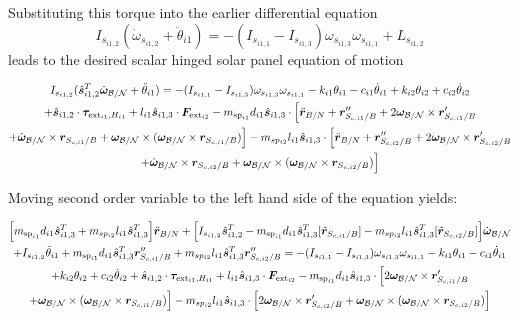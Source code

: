 \documentclass[paper]{aiaaNew}
\begin{document}
	Substituting this torque into the earlier differential equation
\begin{equation}
I_{s_{i1,2}} ( \dot\omega_{s_{i1,2}} + \ddot\theta_{i1}) = - (I_{s_{i1,1}} - I_{s_{i1,3}}) \omega_{s_{i1,3}} \omega_{s_{i1,1}} + L_{s_{i1,2}}
\end{equation}
leads to the desired scalar hinged solar panel equation of motion

\begin{multline}
I_{s_{i1,2}} ( \hat{\bm s}_{i1,2}^T \dot{\bm\omega}_{\cal B/N} + \ddot\theta_{i1}) = - (I_{s_{i1,1}} - I_{s_{i1,3}}) \omega_{s_{i1,3}} \omega_{s_{i1,1}} - k_{i1} \theta_{i1} - c_{i1}\dot{\theta}_{i1} +  k_{i2} \theta_{i2} + c_{i2} \dot\theta_{i2} \\
+ \hat{\bm s}_{i1,2} \cdot \bm \tau_{\text{ext}_{i1},H_{i1}} + l_{i1} \hat{\bm s}_{i1,3} \cdot \bm F_{\text{ext}_{i2}}
- m_{\text{sp}_{i1}} d_{i1} \hat{\bm s}_{i1,3} \cdot \Big[\ddot{\bm{r}}_{B/N} + \bm{r}''_{S_{c,i1}/B} + 2 \bm\omega_{\cal B/N} \times \bm{r}'_{S_{c,i1}/B} \\
+  \dot{\bm\omega}_{\cal B/N} \times \bm{r}_{S_{c,i1}/B}
+ \bm\omega_{\cal B/N} \times (\bm\omega_{\cal B/N} \times \bm{r}_{S_{c,i1}/B})\Big]
- m_{sp_{i2}} l_{i1} \hat{\bm s}_{i1,3} \cdot \Big[\ddot{\bm{r}}_{B/N} + \bm{r}''_{S_{c,i2}/B} + 2 \bm\omega_{\cal B/N} \times \bm{r}'_{S_{c,i2}/B} \\
+  \dot{\bm\omega}_{\cal B/N} \times \bm{r}_{S_{c,i2}/B} + \bm\omega_{\cal B/N} \times (\bm\omega_{\cal B/N} \times \bm{r}_{S_{c,i2}/B})\Big]
\end{multline}

Moving second order variable to the left hand side of the equation yields:

\begin{multline}
\Big[m_{\text{sp}_{i1}} d_{i1} \hat{\bm s}_{i1,3}^T + m_{sp_{i2}} l_{i1} \hat{\bm s}_{i1,3}^T \Big] \ddot{\bm{r}}_{B/N} + \Big[I_{s_{i1,2}} \hat{\bm s}_{i1,2}^T - m_{\text{sp}_{i1}} d_{i1} \hat{\bm s}_{i1,3}^T [\tilde{\bm{r}}_{S_{c,i1}/B}] - m_{sp_{i2}} l_{i1} \hat{\bm s}_{i1,3}^T [\tilde{\bm{r}}_{S_{c,i2}/B}] \Big]\dot{\bm\omega}_{\cal B/N} \\
+ I_{s_{i1,2}} \ddot\theta_{i1} + m_{\text{sp}_{i1}} d_{i1} \hat{\bm s}_{i1,3}^T \bm{r}''_{S_{c,i1}/B}
+ m_{sp_{i2}} l_{i1} \hat{\bm s}_{i1,3}^T \bm{r}''_{S_{c,i2}/B} 
  = - (I_{s_{i1,1}} - I_{s_{i1,3}}) \omega_{s_{i1,3}} \omega_{s_{i1,1}} - k_{i1} \theta_{i1} - c_{i1}\dot{\theta}_{i1} \\
  +  k_{i2} \theta_{i2} + c_{i2} \dot\theta_{i2} 
+ \hat{\bm s}_{i1,2} \cdot \bm \tau_{\text{ext}_{i1},H_{i1}} + l_{i1} \hat{\bm s}_{i1,3} \cdot \bm F_{\text{ext}_{i2}}
- m_{\text{sp}_{i1}} d_{i1} \hat{\bm s}_{i1,3} \cdot \Big[2 \bm\omega_{\cal B/N} \times \bm{r}'_{S_{c,i1}/B} \\
+ \bm\omega_{\cal B/N} \times (\bm\omega_{\cal B/N} \times \bm{r}_{S_{c,i1}/B})\Big]
- m_{sp_{i2}} l_{i1} \hat{\bm s}_{i1,3} \cdot \Big[ 2 \bm\omega_{\cal B/N} \times \bm{r}'_{S_{c,i2}/B} 
 + \bm\omega_{\cal B/N} \times (\bm\omega_{\cal B/N} \times \bm{r}_{S_{c,i2}/B})\Big]
\end{multline}
\end{document}
